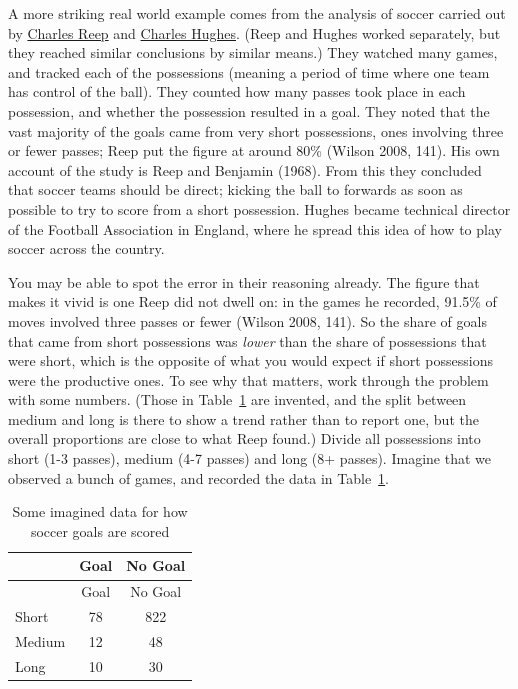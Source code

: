 \documentclass[
  11pt,
  letterpaper,
]{scrbook}
\begin{document}
A more striking real world example comes from the analysis of soccer
carried out by \href{https://en.wikipedia.org/wiki/Charles_Reep}{Charles
Reep} and
\href{https://en.wikipedia.org/wiki/Charles_Hughes_(football_manager)}{Charles
Hughes}. (Reep and Hughes worked separately, but they reached similar
conclusions by similar means.) They watched many games, and tracked each
of the possessions (meaning a period of time where one team has control
of the ball). They counted how many passes took place in each
possession, and whether the possession resulted in a goal. They noted
that the vast majority of the goals came from very short possessions,
ones involving three or fewer passes; Reep put the figure at around 80\%
(Wilson 2008, 141). His own account of the study is Reep and Benjamin
(1968). From this they concluded that soccer teams should be direct;
kicking the ball to forwards as soon as possible to try to score from a
short possession. Hughes became technical director of the Football
Association in England, where he spread this idea of how to play soccer
across the country.

You may be able to spot the error in their reasoning already. The figure
that makes it vivid is one Reep did not dwell on: in the games he
recorded, 91.5\% of moves involved three passes or fewer (Wilson 2008,
141). So the share of goals that came from short possessions was
\emph{lower} than the share of possessions that were short, which is the
opposite of what you would expect if short possessions were the
productive ones. To see why that matters, work through the problem with
some numbers. (Those in Table~\ref{tbl-soccer} are invented, and the
split between medium and long is there to show a trend rather than to
report one, but the overall proportions are close to what Reep found.)
Divide all possessions into short (1-3 passes), medium (4-7 passes) and
long (8+ passes). Imagine that we observed a bunch of games, and
recorded the data in Table~\ref{tbl-soccer}.

\begin{longtable}[]{@{}lcc@{}}
\caption{Some imagined data for how soccer goals are
scored}\label{tbl-soccer}\tabularnewline
\toprule\noalign{}
& Goal & No Goal \\
\midrule\noalign{}
\endfirsthead
\toprule\noalign{}
& Goal & No Goal \\
\midrule\noalign{}
\endhead
\bottomrule\noalign{}
\endlastfoot
Short & 78 & 822 \\
Medium & 12 & 48 \\
Long & 10 & 30 \\
\end{longtable}
\end{document}
